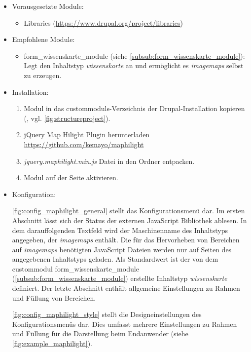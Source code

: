 \begin{itemize}[parsep=0pt, itemsep=5.0pt plus 2.0pt minus 1.0pt, leftmargin=*]
	\item Vorausgesetzte Module:

	\begin{itemize}
		\item Libraries (\url{https://www.drupal.org/project/libraries})
	\end{itemize}


	\item Empfohlene Module:

	\begin{itemize}
		\item form\_wissenskarte\_module (siehe \cref{subsub:form_wissenskarte_module}): Legt den Inhaltstyp \textit{wissenskarte} an und ermöglicht es \textit{\glspl{imagemap}} selbst zu erzeugen.
	\end{itemize}


	\item Installation:
	\begin{enumerate}
		\item Modul in das \glspl{custommodul}-Verzeichnis der Drupal-Installation kopieren  (\zB {}, vgl. \cref{fig:structureproject}).
		\item jQuery Map Hilight Plugin herunterladen \url{https://github.com/kemayo/maphilight}
		\item \textit{jquery.maphilight.min.js} Datei in den Ordner  entpacken.
		\item Modul auf der Seite  aktivieren.
	\end{enumerate}

	\item Konfiguration:

	\cref{fig:config_maphilight_general} stellt das Konfigurationsmenü dar. Im ersten Abschnitt lässt sich der Status der externen JavaScript Bibliothek ablesen. In dem darauffolgenden Textfeld wird der Maschinenname des Inhaltstyps angegeben, der \textit{\glspl{imagemap}} enthält. Die für das Hervorheben von Bereichen auf \textit{\glspl{imagemap}} benötigten JavaScript Dateien werden nur auf Seiten des angegebenen Inhaltstyps geladen. Als Standardwert ist der von dem \gls{custommodul} form\_wissenskarte\_module (\cref{subsub:form_wissenskarte_module}) erstellte Inhaltstyp \textit{wissenskarte} definiert. Der letzte Abschnitt enthält allgemeine Einstellungen zu Rahmen und Füllung von Bereichen.

	\cref{fig:config_maphilight_style} stellt die Designeinstellungen des Konfigurationsmenüs dar. Dies umfasst mehrere Einstellungen zu Rahmen und Füllung für die Darstellung beim Endanwender (siehe \cref{fig:example_maphilight}).

\end{itemize}



